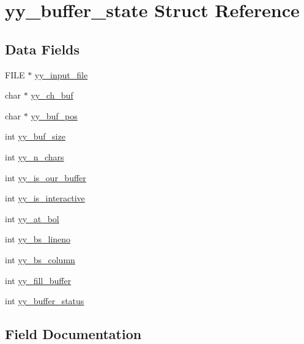 \hypertarget{structyy__buffer__state}{}\section{yy\+\_\+buffer\+\_\+state Struct Reference}
\label{structyy__buffer__state}
\subsection*{Data Fields}
\begin{DoxyCompactItemize}
\item 
F\+I\+LE $\ast$ \hyperlink{structyy__buffer__state_afb2a40bf9a1b84be81d8e8c0bbcbee21}{yy\+\_\+input\+\_\+file}
\item 
char $\ast$ \hyperlink{structyy__buffer__state_af61a9e79f8fc1edb3ae8a2fa2952ce22}{yy\+\_\+ch\+\_\+buf}
\item 
char $\ast$ \hyperlink{structyy__buffer__state_ae8850ab3d90f9339c392020e7d83c4c7}{yy\+\_\+buf\+\_\+pos}
\item 
int \hyperlink{structyy__buffer__state_ae404f23e6786820b0213464ffcf9fd03}{yy\+\_\+buf\+\_\+size}
\item 
int \hyperlink{structyy__buffer__state_aa86c122f2050dbfd365fcf547e6fc1c3}{yy\+\_\+n\+\_\+chars}
\item 
int \hyperlink{structyy__buffer__state_a1e64bbdc1343d886bee3af97e19644bc}{yy\+\_\+is\+\_\+our\+\_\+buffer}
\item 
int \hyperlink{structyy__buffer__state_a2a823a361fbbe1af51a957d0d0cbf4e2}{yy\+\_\+is\+\_\+interactive}
\item 
int \hyperlink{structyy__buffer__state_a8e60af6806593faf52d1cc01148af6e3}{yy\+\_\+at\+\_\+bol}
\item 
int \hyperlink{structyy__buffer__state_a59c414c619ca0071fe3a091336106d82}{yy\+\_\+bs\+\_\+lineno}
\item 
int \hyperlink{structyy__buffer__state_ad9867983bbc1666304d83623cd6e3dd8}{yy\+\_\+bs\+\_\+column}
\item 
int \hyperlink{structyy__buffer__state_a5e492694db97a0d7760d8cc5fd058dfd}{yy\+\_\+fill\+\_\+buffer}
\item 
int \hyperlink{structyy__buffer__state_a6ca09e676a787676260c558a0f731285}{yy\+\_\+buffer\+\_\+status}
\end{DoxyCompactItemize}


\subsection{Field Documentation}
